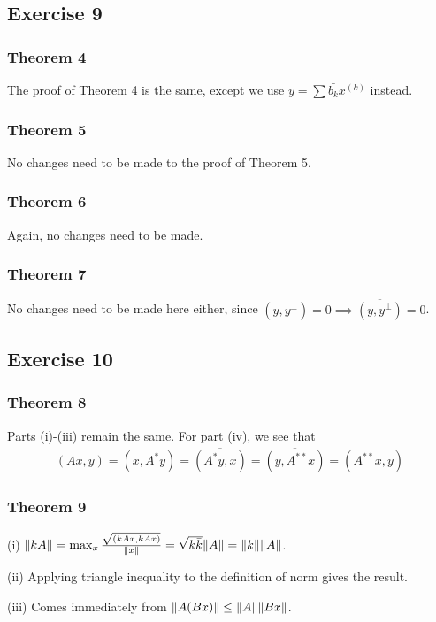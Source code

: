 \subsection{Exercise 9}
\subsubsection{Theorem 4}
The proof of Theorem 4 is the same, except we use $y = \sum \bar{b_k} x^{(k)}$ instead.

\subsubsection{Theorem 5}
No changes need to be made to the proof of Theorem 5.

\subsubsection{Theorem 6}
Again, no changes need to be made.

\subsubsection{Theorem 7}
No changes need to be made here either, since $(y, y^{\perp}) = 0 \implies \overline{(y, y^{\perp})} = 0$.

\subsection{Exercise 10}
\subsubsection{Theorem 8}
Parts (i)-(iii) remain the same. For part (iv), we see that 
\begin{align*}
        (Ax, y) = (x, A^{*}y) = \overline{(A^{*}y, x)} = \overline{(y, A^{**}x)} = (A^{**}x, y)
\end{align*}

\subsubsection{Theorem 9}
(i) $\norm{kA} = \max_x \frac{\sqrt{(kAx, kAx)}}{\norm{x}} = \sqrt{k\bar{k}} \norm{A} = \norm{k} \norm{A}$.

(ii) Applying triangle inequality to the definition of norm gives the result.

(iii) Comes immediately from $\norm{A(Bx)} \leq \norm{A} \norm{Bx}$.

